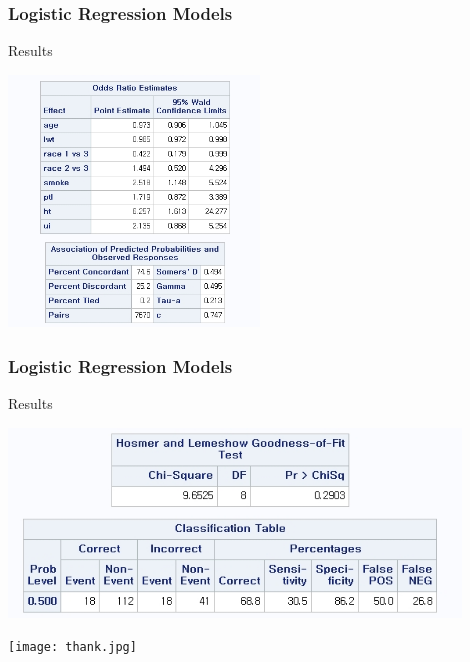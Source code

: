 \documentclass[10pt,xcolor={svgnames},t]{beamer}
\begin{document}
%
%
\begin{frame}
	\frametitle{Logistic Regression Models}
	
	\begin{block}{Results}
		\begin{center}
			\includegraphics[width=0.5\textwidth]{ex5.jpg}
		\end{center} 
	\end{block}
	
\end{frame}
%
%
\begin{frame}
	\frametitle{Logistic Regression Models}
	
	\begin{block}{Results}
		\begin{center}
			\includegraphics[width=0.9\textwidth]{ex6.jpg}
		\end{center} 
	\end{block}
	
\end{frame}
%











%
\begin{frame}
	\begin{center}
		\texttt{[image: thank.jpg]}
	\end{center}
\end{frame}
%
\end{document}
